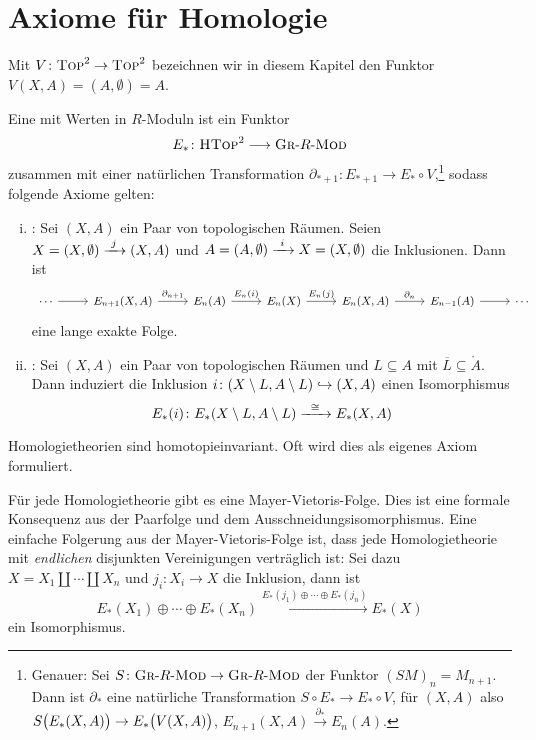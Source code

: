 \newpage

\section{Axiome für Homologie} %
\label{sec:14}

Mit $V \colon \TOP^2 \to \TOP^2$ bezeichnen wir in diesem Kapitel den Funktor $V(X,A) = (A,\emptyset)=A$.

\begin{definition}[{name=[Homologietheorie]},label=def:141]
	Eine  mit Werten in $R$-Moduln ist ein Funktor 
	\[
		E_* \colon \HTOP^2 \longrightarrow \textsc{Gr}\text{-}R\text{-}\MOD
	\]
	zusammen mit einer natürlichen Transformation $\partial_{*+1} \colon E_{*+1}  \to E_{*} \circ V$,\footnote{Genauer: Sei 
	$S \colon \textsc{Gr}\text{-}R\text{-}\MOD \to \textsc{Gr}\text{-}R\text{-}\MOD$ der Funktor $(S M)_n = M_{n+1}$. Dann ist $\partial_*$ eine natürliche Transformation $S \circ E_* \to E_* \circ V$, für $(X,A)$ also $S \enbrace[\big]{E_*(X,A)} \to E_* \enbrace[\big]{V(X,A)}$, $E_{n+1}(X,A) \xrightarrow{\partial_*}E_n(A)$.} sodass folgende Axiome gelten:
	\begin{enumerate}[(i)]
		\item {}: Sei $(X,A)$ ein Paar von topologischen Räumen. 
		Seien $X= (X,\emptyset) \xrightarrow{\minwidthbox{j}{1em}} (X,A)$ und $A= (A,\emptyset) \xrightarrow{\minwidthbox{i}{1em}} X=(X,\emptyset)$ die Inklusionen. Dann ist 
		\[
			\begin{tikzcd}[font=\small]
				\cdots \rar & E_{n+1}(X,A) \rar["\partial_{n+1}"] & E_n(A) \rar["E_n(i)"] & E_n(X) \rar["E_n(j)"] & E_n(X,A) \rar["\partial_{n}"] & E_{n-1}(A) \rar & \cdots
			\end{tikzcd}
		\] 
		eine lange exakte Folge.
		\item {}: Sei $(X,A)$ ein Paar von topologischen Räumen und $L \subseteq A$ mit $\overline{L} \subseteq \mathring{A}$. 
		Dann induziert die Inklusion
		$i \colon \enbrace*{X \setminus L, A \setminus L} \hookrightarrow (X,A)$ einen Isomorphismus
		\[
			E_*(i) \colon E_* \enbrace*{X \setminus L, A \setminus L} \xrightarrow{\enspace \cong \enspace} E_*(X,A)  
		\] 
	\end{enumerate}
\end{definition}

Homologietheorien sind homotopieinvariant. Oft wird dies als eigenes Axiom formuliert.

\begin{bemerkung}[{name=[Mayer-Vietoris-Folge und disjunkten Vereinigungen]}]
	Für jede Homologietheorie gibt es eine Mayer-Vietoris-Folge. 
	Dies ist eine formale Konsequenz aus der Paarfolge und dem Ausschneidungsisomorphismus. 
	Eine einfache Folgerung aus der Mayer-Vietoris-Folge ist, dass jede Homologietheorie mit \emph{endlichen} disjunkten Vereinigungen verträglich ist: 
	Sei dazu $X= X_1 \amalg \cdots \amalg X_n$ und $j_i \colon X_i \to X$ die Inklusion, dann ist 
	\[
		E_*(X_1) \oplus \cdots \oplus E_*(X_n) \xrightarrow{E_*(j_1) \oplus \cdots \oplus E_*(j_n)} E_*(X)
	\]
	ein Isomorphismus.
\end{bemerkung}


